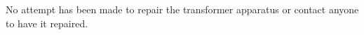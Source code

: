 \documentclass[a4paper,12pt]{article}
\begin{document}
                                                                                                                                                                                                                                                                                                                                                                                                                                                                                                                                                                                                                                                                                                                                                                                                                                                                                                                                                                                                                                                                                                                                                                                                                                                                                                                                                                                                                                                                                                                                                                                                                                                                                                                                                                                                                                                                                               No attempt has been made to repair the transformer apparatus or contact anyone to have it repaired.
\end{document}
